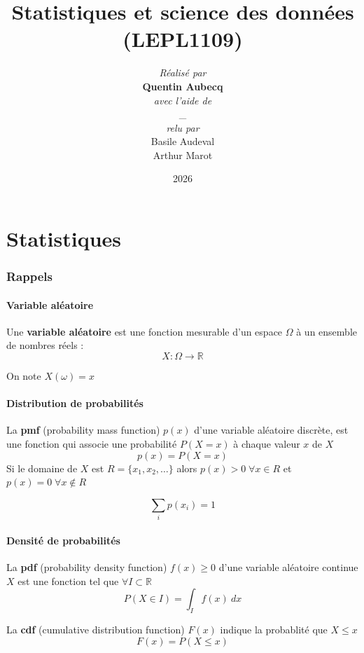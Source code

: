 \documentclass[12pt,a4paper]{article}
\title{Statistiques et science des données (LEPL1109)}
\author{\textit{Réalisé par}\\\textbf{Quentin Aubecq}\\\textit{avec l'aide de}\\ \_ \\\textit{relu par}\\ Basile Audeval\\ Arthur Marot}
\date{2026}
\begin{document}
 



\renewcommand*\contentsname{Table des matières}
\tableofcontents

\break

\part*{Statistiques}                  %

\section{Rappels}

\subsection{Variable aléatoire}

Une \textbf{variable aléatoire} est une fonction mesurable d'un espace $\Omega$ à un ensemble de nombres réels :
$$X : \Omega \rightarrow \mathbb{R}$$

On note $X(\omega) = x$

\subsection{Distribution de probabilités}

La \textbf{pmf} (probability mass function) $p(x)$ d'une variable aléatoire discrète, est une fonction qui associe une probabilité $P(X=x)$ à chaque valeur $x$ de $X$
$$p(x) = P(X=x)$$
Si le domaine de $X$ est $R=\{x_1,x_2,\dots\}$ alors $p(x) > 0 \; \forall x \in R$ et $p(x) = 0 \; \forall x \notin R$

$$\sum_i p(x_i) = 1$$

\subsection{Densité de probabilités}

La \textbf{pdf} (probability density function) $f(x) \geq 0$ d'une variable aléatoire continue $X$ est une fonction tel que $\forall I \subset \mathbb{R}$
$$P(X \in I) = \int_I f(x) \: dx$$

La \textbf{cdf} (cumulative distribution function) $F(x)$ indique la probablité que $X \leq x$
$$F(x) = P(X \leq x)$$
\end{document}
